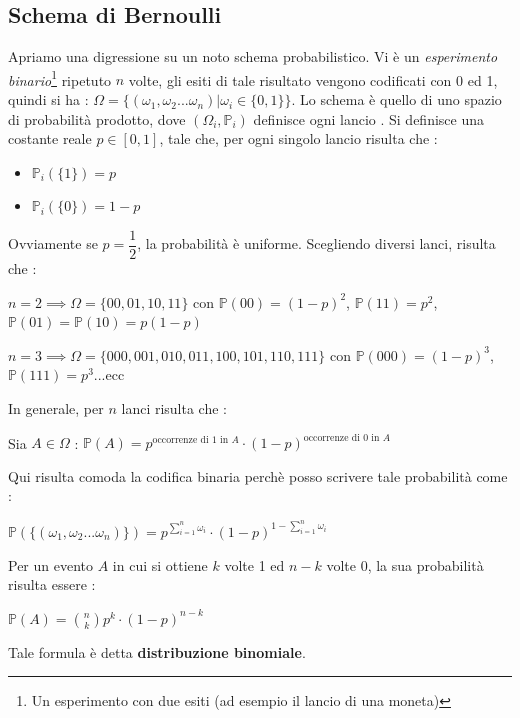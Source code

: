 \documentclass[12pt, letterpaper]{article}
\begin{document}
\subsection{Schema di Bernoulli}\label{schemaBernoulli}
Apriamo una digressione su un noto schema probabilistico. Vi è un \textit{esperimento binario}\footnote{
    Un esperimento con due esiti (ad esempio il lancio di una moneta)
} ripetuto \(n\) volte, gli esiti di tale risultato vengono codificati con 0 ed 1, quindi si ha :
\( \Omega=\{(\omega_1,\omega_2...\omega_n)|\omega_i\in\{0,1\}\} \). Lo schema è quello di uno spazio 
di probabilità prodotto, dove \((\Omega_i,\mathbb{P}_i)\) definisce ogni lancio
. Si definisce una costante reale \(p\in[0,1]\), tale che, per ogni singolo lancio risulta che :\begin{itemize}
    \item \(\mathbb{P}_i(\{1\})=p\)
    \item \(\mathbb{P}_i(\{0\})=1-p\)
\end{itemize}
Ovviamente se \(p=\dfrac{1}{2}\), la probabilità è uniforme. Scegliendo diversi lanci, risulta che :
\begin{center}
   \(n=2\implies \Omega =\{00,01,10,11\}\) con \(\mathbb{P}(00)=(1-p)^2\), \(\mathbb{P}(11)=p^2\), \(\mathbb{P}(01)=\mathbb{P}(10)=p(1-p)\)
\end{center}
\begin{center}
    \(n=3\implies\Omega=\{000,001,010,011,100,101,110,111\}\) con \(\mathbb{P}(000)=(1-p)^3\), \(\mathbb{P}(111)=p^3\)...ecc
\end{center}
In generale, per \(n\) lanci risulta che :\begin{center}
    Sia \(A\in \Omega\) : \(\mathbb{P}(A)=p^{\text{occorrenze di 1 in } A}\cdot (1-p)^{\text{occorrenze di 0 in } A}\)
\end{center}
Qui risulta comoda la codifica binaria perchè posso scrivere tale probabilità come :\begin{center}
    \(\mathbb{P}(\{(\omega_1,\omega_2...\omega_n)\})=\displaystyle p^{\displaystyle \sum^n_{i=1}\omega_i}\cdot (1-p)^{1-\displaystyle \sum^n_{i=1}\omega_i}\)
\end{center}
Per un evento \(A\) in cui si ottiene \(k\) volte 1 ed \(n-k\) volte 0, la sua probabilità risulta 
essere : \begin{center}
    \(\mathbb{P}(A)=\displaystyle\binom{n}{k}p^k\cdot (1-p)^{n-k}\)
\end{center}
Tale formula è detta \textbf{distribuzione binomiale}.
\end{document}
